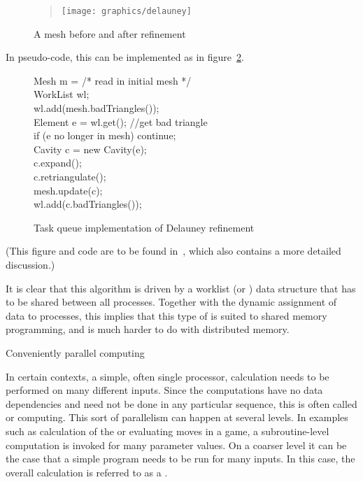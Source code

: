 \begin{figure}[ht]
    \begin{quote}
\texttt{[image: graphics/delauney]}
        \end{quote}
  \caption{A mesh before and after refinement}
  \label{fig:delauney}
\end{figure}

In pseudo-code, this can be implemented as in
figure~\ref{fig:delauney-code}.
\begin{figure}
\begin{displayalgorithm}
Mesh m = /* read in initial mesh */ \\
WorkList wl; \\
wl.add(mesh.badTriangles()); \\
 { 
Element e = wl.get(); //get bad triangle \\
if (e no longer in mesh) continue; \\
Cavity c = new Cavity(e); \\
c.expand(); \\
c.retriangulate(); \\
mesh.update(c); \\
wl.add(c.badTriangles()); \\
}
\end{displayalgorithm}
  \caption{Task queue implementation of Delauney refinement}
  \label{fig:delauney-code}
\end{figure}
(This figure and code are to be found in~\cite{Kulkami:howmuch}, 
which also contains a more detailed discussion.)


It is clear that this algorithm is driven by a worklist (or
) data structure
that has to be shared between all processes. Together with the dynamic
assignment of data to processes, this implies that this type of
 is suited to shared memory
programming, and is much harder to do with distributed memory.


 {Conveniently parallel computing}

In certain contexts, a simple, often single processor, calculation needs to
be performed on many different inputs.
%
Since the computations have no data dependencies and
need not be done in any particular sequence, this is often called
 or  computing.
%
This sort of parallelism can happen at several levels. In examples
such as calculation of the  or evaluating
moves in a  game, a subroutine-level computation is
invoked for many parameter values.
% 
On a coarser level it can be the case that a simple program needs to
be run for many inputs. In this case, the overall calculation
is referred to as a . 

